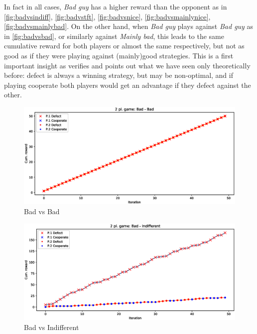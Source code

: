 \documentclass[journal,a4paper,10pt,twoside,draft=false]{IEEEtran}
\begin{document}
In fact in all cases, \textit{Bad guy} has a higher reward than the opponent as in \autoref{fig:badvsindiff}, \autoref{fig:badvstft}, \autoref{fig:badvsnice}, \autoref{fig:badvsmainlynice}, \autoref{fig:badvsmainlybad}. 
On the other hand, when \textit{Bad guy} plays against \textit{Bad guy} as in \autoref{fig:badvsbad}, or similarly against \textit{Mainly bad}, this leads to the same cumulative reward for both players or almost the same respectively, but not as good as if they were playing against (mainly)good strategies. This is a first important insight as verifies and points out what we have seen only theoretically before: defect is always a winning strategy, but may be non-optimal, and if playing cooperate both players would get an advantage if they defect against the other.


\begin{figure}[ht]
    \centering
    \includegraphics[width=1\columnwidth]{../img/ipd2p/ipd2p-rewards-Bad-Bad}
    \caption{Bad vs Bad}
    \label{fig:badvsbad}
\end{figure}

\begin{figure}[ht]
    \centering
    \includegraphics[width=1\columnwidth]{../img/ipd2p/ipd2p-rewards-Bad-Indifferent}
    \caption{Bad vs Indifferent}
    \label{fig:badvsindiff}
\end{figure}
\end{document}
